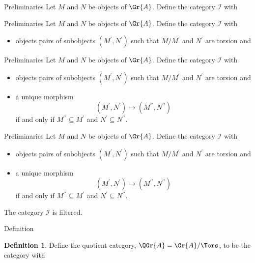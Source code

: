 \documentclass{beamer}
\theoremstyle{definition}
\newtheorem{defn}{Definition}
\begin{document}
\begin{frame}[fragile]{Preliminaries}
  Let $M$ and $N$ be objects of $\Gr{A}$.
  Define the category $\mathscr{I}$ with
\end{frame}

\begin{frame}[fragile]{Preliminaries}
  Let $M$ and $N$ be objects of $\Gr{A}$.
  Define the category $\mathscr{I}$ with
  \begin{itemize}
    \item
      objects pairs of subobjects $(M^\prime, N^\prime)$ such that $M/M^\prime$ and $N^\prime$ are torsion and 
  \end{itemize}
\end{frame}

\begin{frame}[fragile]{Preliminaries}
  Let $M$ and $N$ be objects of $\Gr{A}$.
  Define the category $\mathscr{I}$ with
  \begin{itemize}
    \item
      objects pairs of subobjects $(M^\prime, N^\prime)$ such that $M/M^\prime$ and $N^\prime$ are torsion and 
    \item
      a unique morphism $$(M^\prime, N^\prime) \rightarrow (M^{\prime\prime}, N^{\prime\prime})$$ if and only if $M^{\prime\prime} \subseteq M^\prime$ and $N^\prime \subseteq N^{\prime\prime}$.
  \end{itemize}
\end{frame}

\begin{frame}[fragile]{Preliminaries}
  Let $M$ and $N$ be objects of $\Gr{A}$.
  Define the category $\mathscr{I}$ with
  \begin{itemize}
    \item
      objects pairs of subobjects $(M^\prime, N^\prime)$ such that $M/M^\prime$ and $N^\prime$ are torsion and 
    \item
      a unique morphism $$(M^\prime, N^\prime) \rightarrow (M^{\prime\prime}, N^{\prime\prime})$$ if and only if $M^{\prime\prime} \subseteq M^\prime$ and $N^\prime \subseteq N^{\prime\prime}$.
  \end{itemize}
  The category $\mathscr{I}$ is filtered.
\end{frame}

\begin{frame}[fragile]{Definition}
  \begin{defn}
    Define the quotient category, $\QGr{A} = \Gr{A}/\Tors$, to be the category with
  \end{defn}
\end{frame}
\end{document}
